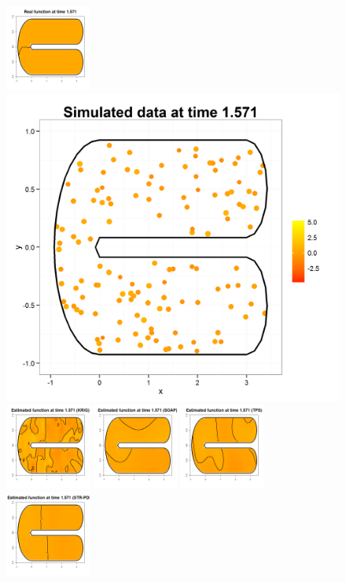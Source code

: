 \documentclass[a4paper,11pt,twoside,openright]{book}							%
\begin{document}
\begin{landscape}
\begin{figure}
\includegraphics[width=0.25\textwidth]{immagini/simulazioni/REALEtempo3.png}
\includegraphics[height=0.25\textwidth]{immagini/simulazioni/Dati_tempo3.png}
\includegraphics[width=0.25\textwidth]{immagini/simulazioni/KRIGtempo3.png}
\includegraphics[width=0.25\textwidth]{immagini/simulazioni/SOAPtempo3.png}
\includegraphics[width=0.25\textwidth]{immagini/simulazioni/TPStempo3.png}
\includegraphics[width=0.25\textwidth]{immagini/simulazioni/STSRtempo3.png}


\end{figure}
\end{landscape}
\end{document}
